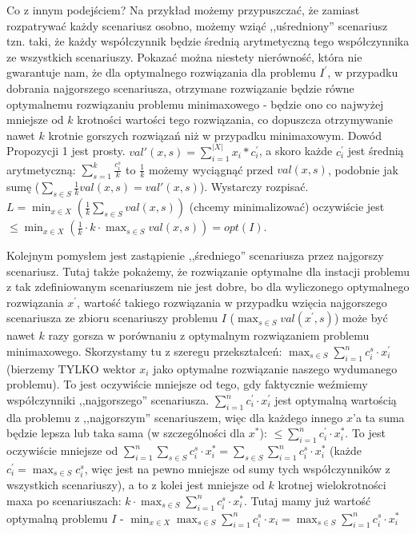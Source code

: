 Co z innym podejściem? Na przykład możemy przypuszczać, że zamiast rozpatrywać każdy scenariusz osobno, możemy wziąć ,,uśredniony'' scenariusz tzn. taki, że każdy współczynnik będzie średnią arytmetyczną tego współczynnika ze wszystkich scenariuszy. Pokazać można niestety nierówność, która nie gwarantuje nam, że dla optymalnego rozwiązania dla problemu $I^{\prime}$, w przypadku dobrania najgorszego scenariusza, otrzymane rozwiązanie będzie równe optymalnemu rozwiązaniu problemu minimaxowego - będzie ono co najwyżej mniejsze od $k$ krotności wartości tego rozwiązania, co dopuszcza otrzymywanie nawet $k$ krotnie gorszych rozwiązań niż w przypadku minimaxowym. Dowód Propozycji 1 jest prosty. $val'(x,s) = \sum_{i=1}^{|X|} x_i * c_i^{\prime}$, a skoro każde $c_{i}^{\prime}$ jest średnią arytmetyczną: $\sum_{s=1}^{k} \frac{c_{i}^{s}}{k}$ to $\frac{1}{k}$ możemy wyciągnąć przed $val(x,s)$, podobnie jak sumę ($\sum_{s \in S} \frac{1}{k} val \left( x, s \right) = val'(x,s)$). Wystarczy rozpisać. $L = \min_{x \in X} \left( \frac{1}{k} \sum_{s \in S} val \left( x, s \right) \right)$ (chcemy minimalizować) oczywiście jest $\leqslant \min_{x \in X} \left( \frac{1}{k} \cdot k \cdot \max_{s \in S} val \left( x, s \right) \right) = opt \left( I \right)$.

Kolejnym pomysłem jest zastąpienie ,,średniego'' scenariusza przez najgorszy scenariusz. Tutaj także pokażemy, że rozwiązanie optymalne dla instacji problemu z tak zdefiniowanym scenariuszem nie jest dobre, bo dla wyliczonego optymalnego rozwiązania $x^{\prime}$, wartość takiego rozwiązania w przypadku wzięcia najgorszego scenariusza ze zbioru scenariuszy problemu $I$ ($\max_{s \in S} val \left( x^{\prime}, s \right)$) może być nawet $k$ razy gorsza w porównaniu z optymalnym rozwiązaniem problemu minimaxowego. Skorzystamy tu z szeregu przekształceń: $\max_{s \in S} \sum_{i=1}^{n} c_{i}^{s} \cdot x_{i}^{\prime}$ (bierzemy TYLKO wektor $x_{i}$ jako optymalne rozwiązanie naszego wydumanego problemu). To jest oczywiście mniejsze od tego, gdy faktycznie weźmiemy współczynniki  ,,najgorszego'' scenariusza. $\sum_{i=1}^{n} c_{i}^{\prime} \cdot x_{i}^{\prime}$ jest optymalną wartością dla problemu z ,,najgorszym'' scenariuszem, więc dla każdego innego $x$'a ta suma będzie lepsza lub taka sama (w szczególności dla $x^{\ast}$): $\leqslant \sum_{i=1}^{n} c_{i}^{\prime} \cdot x_{i}^{\ast}$. To jest oczywiście mniejsze od $\sum_{i=1}^{n} \sum_{s \in S} c_{i}^{s} \cdot x_{i}^{\ast} = \sum_{s \in S} \sum_{i=1}^{n} c_{i}^{s} \cdot x_{i}^{\ast}$ (każde $c_{i}^{\prime} = \max_{s \in S} c_{i}^{s}$, więc jest na pewno mniejsze od sumy tych współczynników z wszystkich scenariuszy), a to z kolei jest mniejsze od $k$ krotnej wielokrotności maxa po scenariuszach: $k \cdot \max_{s \in S} \sum_{i=1}^{n} c_{i}^{s} \cdot x_{i}^{\ast}$. Tutaj mamy już wartość optymalną problemu $I$ - $\min_{x \in X} \max_{s \in S} \sum_{i=1}^{n} c_{i}^{s} \cdot x_{i} = \max_{s \in S} \sum_{i=1}^{n} c_{i}^{s} \cdot x_{i}^{\ast}$

